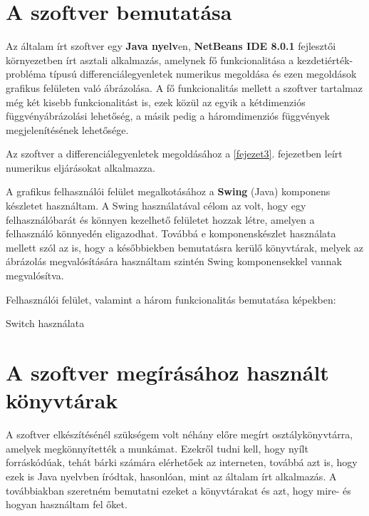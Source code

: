 \section {A szoftver bemutatása}

Az általam írt szoftver egy \textbf{Java nyelv}en, \textbf{NetBeans IDE 8.0.1} fejlesztői környezetben írt asztali alkalmazás, amelynek fő funkcionalitása a kezdetiérték-probléma típusú differenciálegyenletek numerikus megoldása és ezen megoldások grafikus felületen való ábrázolása. A fő funkcionalitás mellett a szoftver tartalmaz még két kisebb funkcionalitást is, ezek közül az egyik a kétdimenziós függvényábrázolási lehetőség, a másik pedig a háromdimenziós függvények megjelenítésének lehetősége.

Az szoftver a differenciálegyenletek megoldásához a \ref{fejezet3}. fejezetben leírt numerikus eljárásokat alkalmazza.

A grafikus felhasználói felület megalkotásához a \textbf{Swing} (Java) komponens készletet használtam. A Swing használatával célom az volt, hogy egy felhasználóbarát és könnyen kezelhető felületet hozzak létre, amelyen a felhasználó könnyedén eligazodhat. Továbbá e komponenskészlet használata mellett szól az is, hogy a későbbiekben bemutatásra kerülő könyvtárak, melyek az ábrázolás megvalósítására használtam szintén Swing komponensekkel vannak megvalósítva.

Felhasználói felület, valamint a három funkcionalitás bemutatása képekben:

\begin{algorithm}[H]
\caption{Switch haszn\'alata}
\end{algorithm}

\section {A szoftver megírásához használt könyvtárak}

	A szoftver elkészítésénél szükségem volt néhány előre megírt osztálykönyvtárra, amelyek megkönnyítették a munkámat. Ezekről tudni kell, hogy nyílt forráskódúak, tehát bárki számára elérhetőek az interneten, továbbá azt is, hogy ezek is Java nyelvben íródtak, hasonlóan, mint az általam írt alkalmazás. A továbbiakban szeretném bemutatni ezeket a könyvtárakat  és azt, hogy mire- és hogyan használtam fel őket.
	
